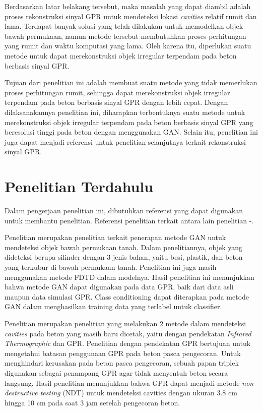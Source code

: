 \documentclass[conference]{IEEEtran}
\begin{document}
Berdasarkan latar belakang tersebut, maka masalah yang dapat diambil adalah proses rekonstruksi sinyal GPR untuk mendeteksi lokasi \emph{cavities} relatif rumit dan lama. 
Terdapat banyak solusi yang telah dilakukan untuk memodelkan objek bawah permukaan, namun metode tersebut membutuhkan proses perhitungan yang rumit dan waktu komputasi yang lama. 
Oleh karena itu, diperlukan suatu metode untuk dapat merekonstruksi objek irregular terpendam pada beton berbasis sinyal GPR.

Tujuan dari penelitian ini adalah membuat suatu metode yang tidak memerlukan proses perhitungan rumit, sehingga dapat merekonstruksi objek irregular terpendam pada beton berbasis sinyal GPR dengan lebih cepat.
Dengan dilaksanakannya penelitian ini, diharapkan terbentuknya suatu metode untuk merekonstruksi objek irregular terpendam pada beton berbasis sinyal GPR yang beresolusi tinggi pada beton dengan menggunakan GAN. 
Selain itu, penelitian ini juga dapat menjadi referensi untuk penelitian selanjutnya terkait rekonstruksi sinyal GPR.

\section{Penelitian Terdahulu}

Dalam pengerjaan penelitian ini, dibutuhkan referensi yang dapat digunakan untuk membantu penelitian. 
Referensi penelitian terkait antara lain penelitian \cite{b1}-\cite{b3}.

Penelitian \cite{b1} merupakan penelitian terkait penerapan metode GAN untuk mendeteksi objek bawah permukaan tanah. 
Dalam penelitiannya, objek yang dideteksi berupa silinder dengan 3 jenis bahan, yaitu besi, plastik, dan beton yang terkubur di bawah permukaan tanah. 
Penelitian ini juga masih menggunakan metode FDTD dalam modelnya. 
Hasil penelitian ini menunjukkan bahwa metode GAN dapat digunakan pada data GPR, baik dari data asli maupun data simulasi GPR. 
Class conditioning dapat diterapkan pada metode GAN dalam menghasilkan training data yang terlabel untuk classifier.

Penelitian \cite{b2} merupakan penelitian yang melakukan 2 metode dalam mendeteksi \emph{cavities} pada beton yang masih baru dicetak, yaitu dengan pendekatan \emph{Infrared Thermographic} dan GPR. 
Penelitian dengan pendekatan GPR bertujuan untuk mengetahui batasan penggunaan GPR pada beton pasca pengecoran. 
Untuk menghindari kerusakan pada beton pasca pengecoran, sebuah papan triplek digunakan sebagai penampang GPR agar tidak menyentuh beton secara langsung. 
Hasil penelitian menunjukkan bahwa GPR dapat menjadi metode \emph{non-destructive testing} (NDT) untuk mendeteksi cavities dengan ukuran 3.8 cm hingga 10 cm pada saat 3 jam setelah pengecoran beton.
\end{document}
